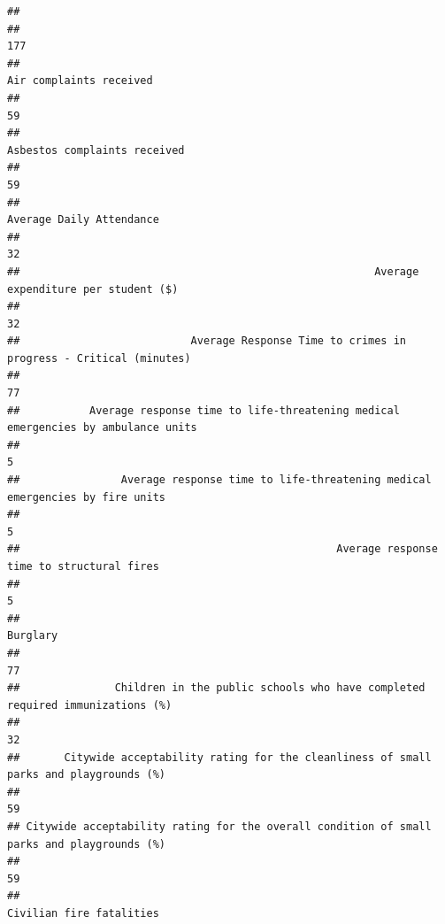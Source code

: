 \documentclass[]{article}
\begin{document}
\begin{verbatim}
##                                                                                            
##                                                                                        177 
##                                                                    Air complaints received 
##                                                                                         59 
##                                                               Asbestos complaints received 
##                                                                                         59 
##                                                                   Average Daily Attendance 
##                                                                                         32 
##                                                        Average expenditure per student ($) 
##                                                                                         32 
##                           Average Response Time to crimes in progress - Critical (minutes) 
##                                                                                         77 
##           Average response time to life-threatening medical emergencies by ambulance units 
##                                                                                          5 
##                Average response time to life-threatening medical emergencies by fire units 
##                                                                                          5 
##                                                  Average response time to structural fires 
##                                                                                          5 
##                                                                                   Burglary 
##                                                                                         77 
##               Children in the public schools who have completed required immunizations (%) 
##                                                                                         32 
##       Citywide acceptability rating for the cleanliness of small parks and playgrounds (%) 
##                                                                                         59 
## Citywide acceptability rating for the overall condition of small parks and playgrounds (%) 
##                                                                                         59 
##                                                                   Civilian fire fatalities 

\end{verbatim}
\end{document}

